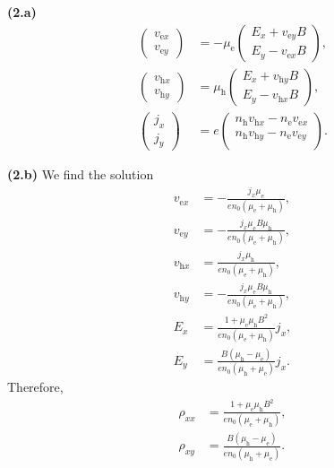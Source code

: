 \documentclass{article}
\makeatletter
\newcommand*{\shifttext}[1]{%
  \settowidth{\@tempdima}{#1}%
  \hspace{-\@tempdima}#1%
}
\newcommand{\plabel}[1]{%
\shifttext{\textbf{#1}\quad}%
}
\newcommand{\minusbaseline}{\abovedisplayskip=0pt\abovedisplayshortskip=0pt~\vspace*{-\baselineskip}}%
\makeatother
\begin{document}
\plabel{(2.a)}%
\begingroup\minusbaseline
\begin{align*}
  \begin{pmatrix}
    v_{\mathrm{e}x} \\
    v_{\mathrm{e}y}
  \end{pmatrix} &= -\mu_{\mathrm{e}} \begin{pmatrix}
    E_x + v_{\mathrm{e}y}B \\
    E_y - v_{\mathrm{e}x}B
  \end{pmatrix}, \\
  \begin{pmatrix}
    v_{\mathrm{h}x} \\
    v_{\mathrm{h}y}
  \end{pmatrix} &= \mu_{\mathrm{h}} \begin{pmatrix}
    E_x + v_{\mathrm{h}y}B \\
    E_y - v_{\mathrm{h}x}B
  \end{pmatrix}, \\
  \begin{pmatrix}
    j_x \\ j_y
  \end{pmatrix} &= e \begin{pmatrix}
    n_{\mathrm{h}} v_{\mathrm{h}x} - n_{\mathrm{e}} v_{\mathrm{e}x} \\
    n_{\mathrm{h}} v_{\mathrm{h}y} - n_{\mathrm{e}} v_{\mathrm{e}y} \\
  \end{pmatrix}.
\end{align*}
\endgroup

\plabel{(2.b)}%
We find the solution
\begin{align*}
  v_{\mathrm{e}x} &= -\frac{j_x \mu_{\mathrm{e}}}{e n_0(\mu_{\mathrm{e}} + \mu_{\mathrm{h}})}, \\
  v_{\mathrm{e}y} &= -\frac{j_x \mu_{\mathrm{e}} B \mu_{\mathrm{h}}}{e n_0(\mu_{\mathrm{e}} + \mu_{\mathrm{h}})}, \\
  v_{\mathrm{h}x} &= \frac{j_x \mu_{\mathrm{h}}}{e n_0(\mu_{\mathrm{e}} + \mu_{\mathrm{h}})}, \\
  v_{\mathrm{h}y} &= -\frac{j_x \mu_{\mathrm{e}} B \mu_{\mathrm{h}}}{e n_0(\mu_{\mathrm{e}} + \mu_{\mathrm{h}})}, \\
  E_x &= \frac{1 + \mu_{\mathrm{e}} \mu_{\mathrm{h}} B^2}{e n_0(\mu_{\mathrm{e}} + \mu_{\mathrm{h}})} j_x, \\
  E_y &= \frac{B(\mu_{\mathrm{h}} - \mu_{\mathrm{e}})}{e n_0(\mu_{\mathrm{h}} + \mu_{\mathrm{e}})} j_x.
\end{align*}
Therefore,
\begin{align*}
  \rho_{xx} &= \frac{1 + \mu_{\mathrm{e}} \mu_{\mathrm{h}} B^2}{e n_0(\mu_{\mathrm{e}} + \mu_{\mathrm{h}})}, \\
  \rho_{xy} &= \frac{B(\mu_{\mathrm{h}} - \mu_{\mathrm{e}})}{e n_0(\mu_{\mathrm{h}} + \mu_{\mathrm{e}})}.
\end{align*}
\end{document}
